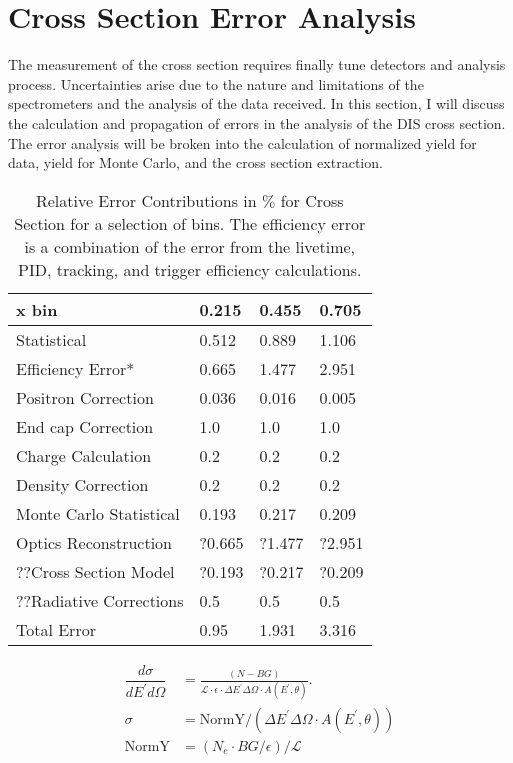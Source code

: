 \section{Cross Section Error Analysis}
The measurement of the cross section requires finally tune detectors and analysis process. Uncertainties arise due to the nature and limitations of the spectrometers and the analysis of the data received. In this section, I will discuss the calculation and propagation of errors in the analysis of the DIS cross section. The error analysis will be broken into the calculation of normalized yield for data, yield for Monte Carlo, and the cross section extraction. 
\begin{table}[]
	\caption{Relative Error Contributions in $\%$ for Cross Section for a selection of bins. The efficiency error is a combination of the error from the livetime, PID, tracking, and trigger efficiency calculations.}
	\centering
	\begin{tabular}{|l|l|l|l|}
		\hline
		\textbf{\qquad \qquad\qquad x bin}   & \textbf{0.215} & \textbf{0.455} & \textbf{0.705} \\ \hline\hline
		Statistical             & 0.512 & 0.889 & 1.106 \\ \hline
		Efficiency Error*       & 0.665 & 1.477 & 2.951 \\ \hline
		Positron Correction     & 0.036 & 0.016 & 0.005 \\ \hline
		End cap Correction     & 1.0 & 1.0 & 1.0 \\ \hline
		Charge Calculation     & 0.2 & 0.2 & 0.2 \\ \hline
		Density Correction      & 0.2 & 0.2 & 0.2 \\ \hline
		Monte Carlo Statistical & 0.193 & 0.217 & 0.209 \\ \hline
		Optics Reconstruction	& ?0.665& ?1.477 &?2.951 \\ \hline
		??Cross Section Model 	& ?0.193 & ?0.217 & ?0.209 \\ \hline
		??Radiative Corrections\cite{primer} 	& 0.5  & 0.5 & 0.5 \\ \hline
		Total Error		 	 	& 0.95  & 1.931 & 3.316 \\ \hline
	\end{tabular}
\end{table}

\begin{align}
\dfrac{d\sigma}{dE^{\prime}d\Omega} &= \frac{(N - BG)}{\mathscr{L} \cdot \epsilon \cdot \Delta E^{\prime} \Delta \Omega \cdot A(E^{\prime},\theta)}. \nonumber\\
\sigma &= \text{NormY}/\left(\Delta E^{\prime} \Delta \Omega \cdot A(E^{\prime},\theta)\right)\nonumber\\
\text{NormY} &= \left(N_e \cdot BG/\epsilon \right) / \mathscr{L}
\end{align}
